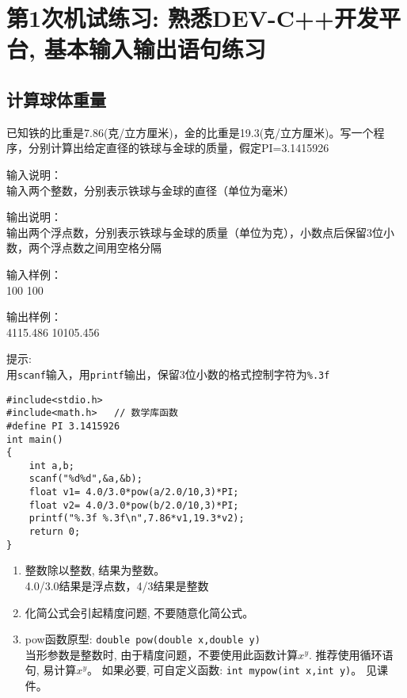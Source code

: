 %
%
%
\chapter{第1次机试练习: 熟悉DEV-C++开发平台, 基本输入输出语句练习}

\section{计算球体重量}
已知铁的比重是7.86(克/立方厘米)，金的比重是19.3(克/立方厘米)。写一个程序，分别计算出给定直径的铁球与金球的质量，假定PI=3.1415926

输入说明：\\
输入两个整数，分别表示铁球与金球的直径（单位为毫米）

输出说明：\\
输出两个浮点数，分别表示铁球与金球的质量（单位为克），小数点后保留3位小数，两个浮点数之间用空格分隔

输入样例：\\
100 100

输出样例：\\
4115.486  10105.456

提示: \\
用\lstinline|scanf|输入，用\lstinline|printf|输出，保留3位小数的格式控制字符为\lstinline|%.3f|

\begin{lstlisting}
#include<stdio.h>
#include<math.h>   // 数学库函数 
#define PI 3.1415926       
int main()                   
{  
	int a,b;
	scanf("%d%d",&a,&b);
	float v1= 4.0/3.0*pow(a/2.0/10,3)*PI;
	float v2= 4.0/3.0*pow(b/2.0/10,3)*PI;
	printf("%.3f %.3f\n",7.86*v1,19.3*v2); 
	return 0;           
}                   
\end{lstlisting}

\begin{note}[要点]
	\begin{enumerate}
		\item 整数除以整数, 结果为整数。\\
		4.0/3.0结果是浮点数，4/3结果是整数
		\item 化简公式会引起精度问题, 不要随意化简公式。
		\item pow函数原型: \lstinline|double pow(double x,double y)|\\
		当形参数是整数时, 由于精度问题，不要使用此函数计算$x^y$. 推荐使用循环语句, 易计算$x^y$。 如果必要, 可自定义函数: \lstinline|int mypow(int x,int y)|。 见课件。
	\end{enumerate}
\end{note}

